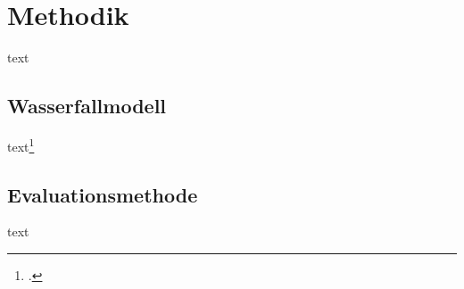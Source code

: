 \section{Methodik}
text
\subsection{Wasserfallmodell}
text\footcite{FrauchigerDaniel2017AvDS}
\subsection{Evaluationsmethode}
text